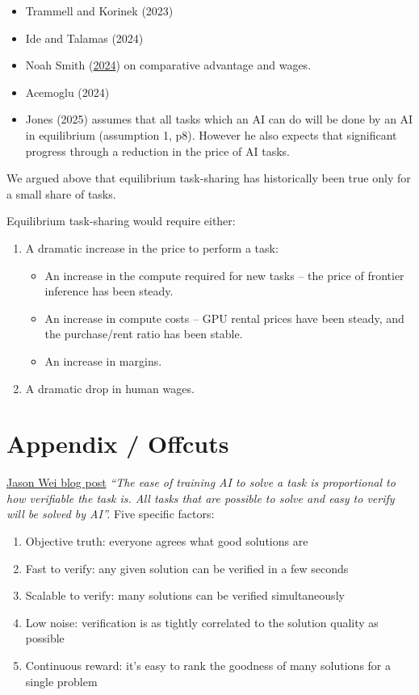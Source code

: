 \documentclass[
  letterpaper,
  DIV=11,
  numbers=noendperiod,
  oneside]{scrartcl}
\providecommand{\tightlist}{%
  \setlength{\itemsep}{0pt}\setlength{\parskip}{0pt}}
\begin{document}
\begin{itemize}
\tightlist
\item
  Trammell and Korinek (2023)
\item
  Ide and Talamas (2024)
\item
  Noah Smith
  (\href{https://www.noahpinion.blog/p/plentiful-high-paying-jobs-in-the}{2024})
  on comparative advantage and wages.
\item
  Acemoglu (2024)
\item
  Jones (2025) assumes that all tasks which an AI can do will be done by
  an AI in equilibrium (assumption 1, p8). However he also expects that
  significant progress through a reduction in the price of AI tasks.
\end{itemize}

We argued above that equilibrium task-sharing has historically been true
only for a small share of tasks.

Equilibrium task-sharing would require either:

\begin{enumerate}
\def\labelenumi{\arabic{enumi}.}
\tightlist
\item
  A dramatic increase in the price to perform a task:

  \begin{itemize}
  \tightlist
  \item
    An increase in the compute required for new tasks -- the price of
    frontier inference has been steady.
  \item
    An increase in compute costs -- GPU rental prices have been steady,
    and the purchase/rent ratio has been stable.
  \item
    An increase in margins.
  \end{itemize}
\item
  A dramatic drop in human wages.
\end{enumerate}

\section{Appendix / Offcuts}\label{appendix-offcuts}

\href{https://www.jasonwei.net/blog/asymmetry-of-verification-and-verifiers-law}{Jason
Wei blog post} \emph{``The ease of training AI to solve a task is
proportional to how verifiable the task is. All tasks that are possible
to solve and easy to verify will be solved by AI''.} Five specific
factors:

\begin{enumerate}
\def\labelenumi{\arabic{enumi}.}
\tightlist
\item
  Objective truth: everyone agrees what good solutions are
\item
  Fast to verify: any given solution can be verified in a few seconds
\item
  Scalable to verify: many solutions can be verified simultaneously
\item
  Low noise: verification is as tightly correlated to the solution
  quality as possible
\item
  Continuous reward: it's easy to rank the goodness of many solutions
  for a single problem
\end{enumerate}
\end{document}
